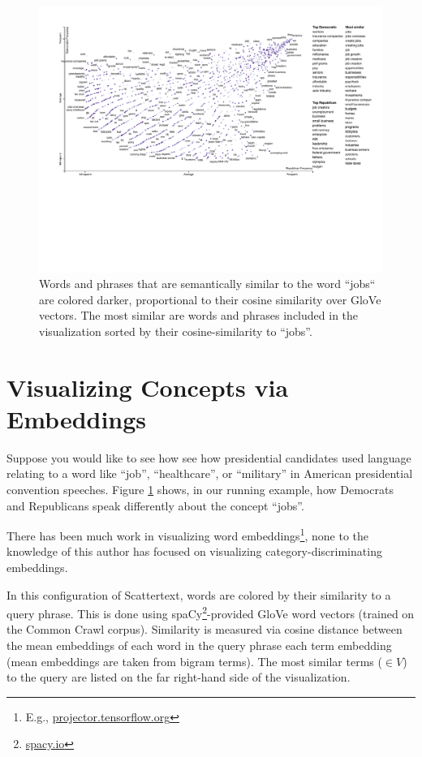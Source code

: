 \documentclass[11pt]{article}
\begin{document}
\begin{figure}[h!!]
  \includegraphics[width=\linewidth]{similarity_scattertext}
  \caption{Words and phrases that are semantically similar to the word ``jobs`` are colored darker, proportional to their cosine similarity over GloVe vectors. The most similar are words and phrases included in the visualization sorted by their cosine-similarity to ``jobs''.}
  \label{scattertextembeddings}
\end{figure}

\vspace{-0.3cm}
\section{Visualizing Concepts via Embeddings}
\label{embeddings}

Suppose you would like to see how see how presidential candidates used language relating to a word like ``job'', ``healthcare'', or ``military'' in American presidential convention speeches.   Figure \ref{scattertextembeddings} shows, in our running example, how Democrats and Republicans speak differently about the concept ``jobs''.  

There has been much work in visualizing word embeddings\footnote{E.g., \href{http://projector.tensorflow.org/}{projector.tensorflow.org}}, none to the knowledge of this author has focused on visualizing category-discriminating embeddings.

In this configuration of Scattertext, words are colored by their similarity to a query phrase.  This is done using spaCy\footnote{\href{https://spacy.io/}{spacy.io}}-provided GloVe \cite{glove} word vectors (trained on the Common Crawl corpus).  Similarity is measured via cosine distance between the mean embeddings of each word in the query phrase each term embedding (mean embeddings are taken from bigram terms).  The most similar terms (${\in}
V$) to the query are listed on the far right-hand side of the visualization. 
\end{document}
